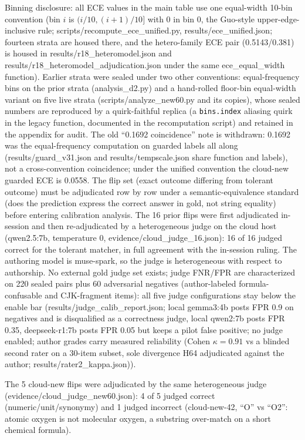\documentclass[10pt]{article} %
\begin{document}
Binning disclosure: all ECE values in the main table use one equal-width 10-bin convention (bin $i$ is $(i/10,(i+1)/10]$ with $0$ in bin $0$, the Guo-style upper-edge-inclusive rule; scripts/recompute\_ece\_unified.py, results/ece\_unified.json; fourteen strata are housed there, and the hetero-family ECE pair (0.5143/0.381) is housed in results/r18\_heteromodel.json and results/r18\_heteromodel\_adjudication.json under the same ece\_equal\_width function). Earlier strata were sealed under two other conventions: equal-frequency bins on the prior strata (analysis\_d2.py) and a hand-rolled floor-bin equal-width variant on five live strata (scripts/analyze\_new60.py and its copies), whose sealed numbers are reproduced by a quirk-faithful replica (a \texttt{bins.index} aliasing quirk in the legacy function, documented in the recomputation script) and retained in the appendix for audit. The old ``0.1692 coincidence'' note is withdrawn: 0.1692 was the equal-frequency computation on guarded labels all along (results/guard\_v31.json and results/tempscale.json share function and labels), not a cross-convention coincidence; under the unified convention the cloud-new guarded ECE is 0.0558. The flip set (exact outcome differing from tolerant outcome) must be adjudicated row by row under a semantic-equivalence standard (does the prediction express the correct answer in gold, not string equality) before entering calibration analysis. The 16 prior flips were first adjudicated in-session and then re-adjudicated by a heterogeneous judge on the cloud host (qwen2.5:7b, temperature 0, evidence/cloud\_judge\_16.json): 16 of 16 judged correct for the tolerant matcher, in full agreement with the in-session ruling. The authoring model is muse-spark, so the judge is heterogeneous with respect to authorship. No external gold judge set exists; judge FNR/FPR are characterized on 220 sealed pairs plus 60 adversarial negatives (author-labeled formula-confusable and CJK-fragment items): all five judge configurations stay below the enable bar (results/judge\_calib\_report.json; local gemma3:4b posts FPR 0.9 on negatives and is disqualified as a correctness judge, local qwen2:7b posts FPR 0.35, deepseek-r1:7b posts FPR 0.05 but keeps a pilot false positive; no judge enabled; author grades carry measured reliability (Cohen $\kappa=0.91$ vs a blinded second rater on a 30-item subset, sole divergence H64 adjudicated against the author; results/rater2\_kappa.json)).

The 5 cloud-new flips were adjudicated by the same heterogeneous judge (evidence/cloud\_judge\_new60.json): 4 of 5 judged correct (numeric/unit/synonymy) and 1 judged incorrect (cloud-new-42, ``O'' vs ``O2'': atomic oxygen is not molecular oxygen, a substring over-match on a short chemical formula).
\end{document}
